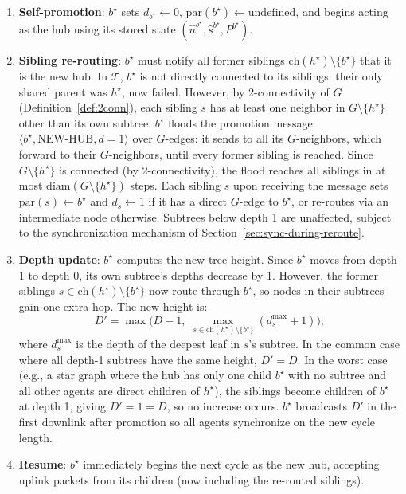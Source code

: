 \documentclass{article}
\begin{document}
\begin{enumerate}
    \item \textbf{Self-promotion}: $b^\star$ sets $d_{b^\star} \leftarrow 0$,
        $\mathrm{par}(b^\star) \leftarrow \text{undefined}$, and begins acting as the
        hub using its stored state $(\hat{n}^{b^\star}, \hat{s}^{b^\star}, P^{b^\star})$.

    \item \textbf{Sibling re-routing}: $b^\star$ must notify all former siblings
        $\mathrm{ch}(h^\star) \setminus \{b^\star\}$ that it is the new hub. In
        $\mathcal{T}$, $b^\star$ is not directly connected to its siblings: their only
        shared parent was $h^\star$, now failed. However, by 2-connectivity of $G$
        (Definition~\ref{def:2conn}), each sibling $s$ has at least one neighbor in
        $G \setminus \{h^\star\}$ other than its own subtree. $b^\star$ floods the
        promotion message $\langle b^\star, \text{NEW-HUB}, d=1 \rangle$ over $G$-edges:
        it sends to all its $G$-neighbors, which forward to their $G$-neighbors, until
        every former sibling is reached. Since $G \setminus \{h^\star\}$ is connected
        (by 2-connectivity), the flood reaches all siblings in at most $\mathrm{diam}(G
        \setminus \{h^\star\})$ steps. Each sibling $s$ upon receiving the message sets
        $\mathrm{par}(s) \leftarrow b^\star$ and $d_s \leftarrow 1$ if it has a direct
        $G$-edge to $b^\star$, or re-routes via an intermediate node otherwise. Subtrees
        below depth 1 are unaffected, subject to the synchronization mechanism of
        Section~\ref{sec:sync-during-reroute}.

    \item \textbf{Depth update}: $b^\star$ computes the new tree height. Since $b^\star$
        moves from depth 1 to depth 0, its own subtree's depths decrease by 1. However,
        the former siblings $s \in \mathrm{ch}(h^\star) \setminus \{b^\star\}$ now route
        through $b^\star$, so nodes in their subtrees gain one extra hop. The new height
        is:
        \[
            D' = \max\!\bigl(D - 1,\; \max_{s \in \mathrm{ch}(h^\star) \setminus \{b^\star\}} (d_s^{\max} + 1)\bigr),
        \]
        where $d_s^{\max}$ is the depth of the deepest leaf in $s$'s subtree. In the
        common case where all depth-1 subtrees have the same height, $D' = D$. In the
        worst case (e.g., a star graph where the hub has only one child $b^\star$ with no
        subtree and all other agents are direct children of $h^\star$), the siblings
        become children of $b^\star$ at depth 1, giving $D' = 1 = D$, so no increase
        occurs. $b^\star$ broadcasts $D'$ in the first downlink after promotion so all
        agents synchronize on the new cycle length.

    \item \textbf{Resume}: $b^\star$ immediately begins the next cycle as the new hub,
        accepting uplink packets from its children (now including the re-routed siblings).
\end{enumerate}
\end{document}

